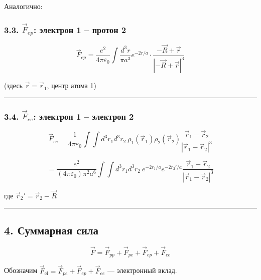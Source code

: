 \documentclass[11pt]{article}
\begin{document}
Аналогично:

\subsubsection{\texorpdfstring{3.3. \(\vec{F}_{ep}\): электрон 1 --
протон
2}{3.3. \textbackslash{}vec\{F\}\_\{ep\}: электрон 1 -- протон 2}}\label{vecf_ep-ux44dux43bux435ux43aux442ux440ux43eux43d-1-ux43fux440ux43eux442ux43eux43d-2}

\[
\vec{F}_{ep} = \frac{e^2}{4\pi\varepsilon_0} \int \frac{d^3r}{\pi a^3} e^{-2r/a} \cdot \frac{ -\vec{R} + \vec{r} }{ |-\vec{R} + \vec{r}|^3 }
\]

(здесь \(\vec{r} = \vec{r}_1\), центр атома 1)

\begin{center}\rule{0.5\linewidth}{\linethickness}\end{center}

\subsubsection{\texorpdfstring{3.4. \(\vec{F}_{ee}\): электрон 1 --
электрон
2}{3.4. \textbackslash{}vec\{F\}\_\{ee\}: электрон 1 -- электрон 2}}\label{vecf_ee-ux44dux43bux435ux43aux442ux440ux43eux43d-1-ux44dux43bux435ux43aux442ux440ux43eux43d-2}

\[
\vec{F}_{ee} = \frac{1}{4\pi\varepsilon_0} \int \int d^3r_1 d^3r_2\ \rho_1(\vec{r}_1) \rho_2(\vec{r}_2) \frac{ \vec{r}_1 - \vec{r}_2 }{ |\vec{r}_1 - \vec{r}_2|^3 }
\]

\[
= \frac{e^2}{(4\pi\varepsilon_0) \pi^2 a^6} \int \int d^3r_1 d^3r_2\ e^{-2r_1/a} e^{-2r_2'/a} \frac{ \vec{r}_1 - \vec{r}_2 }{ |\vec{r}_1 - \vec{r}_2|^3 }
\]

где \(\vec{r}_2' = \vec{r}_2 - \vec{R}\)

\begin{center}\rule{0.5\linewidth}{\linethickness}\end{center}

\subsection{4. Суммарная
сила}\label{ux441ux443ux43cux43cux430ux440ux43dux430ux44f-ux441ux438ux43bux430}

\[
\vec{F} = \vec{F}_{pp} + \vec{F}_{pe} + \vec{F}_{ep} + \vec{F}_{ee}
\]

Обозначим
\(\vec{F}_{\text{el}} = \vec{F}_{pe} + \vec{F}_{ep} + \vec{F}_{ee}\) ---
электронный вклад.
\end{document}
